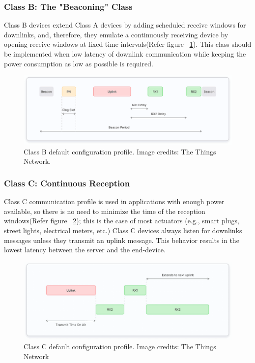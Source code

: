 \subsubsection{Class B: The "Beaconing" Class}

Class B devices extend Class A devices by adding scheduled receive windows for downlinks, and, therefore, they emulate a continuously receiving device by opening receive windows at fixed time intervals(Refer figure ~\ref{ClassBProfile}). This class should be implemented when low latency of downlink communication while keeping the power consumption as low as possible is required.  \cite{ArduinoLoRaWAN101:2024}

\begin{figure}
	\begin{center}
		\includegraphics[width=0.7\linewidth]{Images/LORA/ClassBProfile.png}
		\caption{Class B default configuration profile. Image credits: The Things Network.}
		\label{ClassBProfile} 
	\end{center}
\end{figure}

\subsubsection{Class C: Continuous Reception}

Class C communication profile is used in applications with enough power available, so there is no need to minimize the time of the reception windows(Refer figure ~\ref{ClassCProfile}); this is the case of most actuators (e.g., smart plugs, street lights, electrical meters, etc.) Class C devices always listen for downlinks messages unless they transmit an uplink message. This behavior results in the lowest latency between the server and the end-device.  \cite{ArduinoLoRaWAN101:2024}

\begin{figure}
	\begin{center}
		\includegraphics[width=0.7\linewidth]{Images/LORA/ClassCProfile.png}
		\caption{Class C default configuration profile. Image credits: The Things Network}
		\label{ClassCProfile}
	\end{center}
\end{figure}

